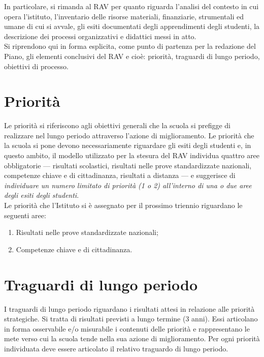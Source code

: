 \documentclass[12pt,a4paper,oneside]{memoir}
\begin{document}
In particolare, si rimanda al RAV per quanto riguarda l'analisi del contesto in cui opera l'istituto, l'inventario delle risorse materiali, finanziarie, strumentali ed umane di cui si avvale, gli esiti documentati degli apprendimenti degli studenti, la descrizione dei processi organizzativi e didattici messi in atto.\\

Si riprendono qui in forma esplicita, come punto di partenza per la redazione del Piano, gli elementi conclusivi del RAV e cioè: priorità, traguardi di lungo periodo, obiettivi di processo.\\

\section{Priorità}
Le priorità si riferiscono agli obiettivi generali che la scuola si prefigge di realizzare nel lungo periodo attraverso l'azione di miglioramento. Le priorità che la scuola si pone devono necessariamente riguardare gli esiti degli studenti e, in questo ambito, il modello utilizzato per la stesura del RAV individua quattro aree obbligatorie --- risultati scolastici, risultati nelle prove standardizzate nazionali, competenze chiave e di cittadinanza, risultati a distanza --- e suggerisce di \textit{individuare un numero limitato di priorità (1 o 2) all'interno di una o due aree degli esiti degli studenti}.\\

Le priorità che l'Istituto si è assegnato per il prossimo triennio riguardano le seguenti aree:
\begin{enumerate}
\item Risultati nelle prove standardizzate nazionali;
\item Competenze chiave e di cittadinanza.
\label{priorità}
\end{enumerate}

\section{Traguardi di lungo periodo}
I traguardi di lungo periodo riguardano i risultati attesi in relazione alle priorità strategiche. Si tratta di risultati previsti a lungo termine (3 anni). Essi articolano in forma osservabile e/o misurabile i contenuti delle priorità e rappresentano le mete verso cui la scuola tende nella sua azione di miglioramento. Per ogni priorità individuata deve essere articolato il relativo traguardo di lungo periodo.\\
\end{document}
